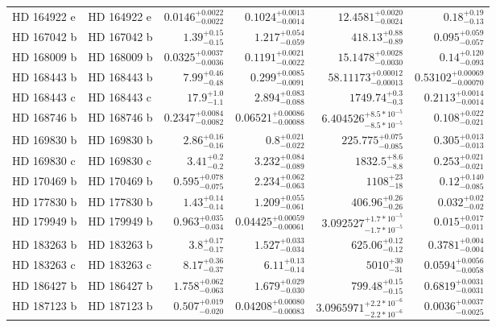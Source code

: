 \begin{longtable*}{llrrrr}
HD 164922 e & HD 164922 e & $0.0146^{+0.0022}_{-0.0022}$ & $0.1024^{+0.0013}_{-0.0014}$ & $12.4581^{+0.0020}_{-0.0024}$ & $0.18^{+0.19}_{-0.13}$ \\ 
HD 167042 b & HD 167042 b & $1.39^{+0.15}_{-0.15}$ & $1.217^{+0.054}_{-0.059}$ & $418.13^{+0.88}_{-0.89}$ & $0.095^{+0.059}_{-0.057}$ \\ 
HD 168009 b & HD 168009 b & $0.0325^{+0.0037}_{-0.0036}$ & $0.1191^{+0.0021}_{-0.0022}$ & $15.1478^{+0.0028}_{-0.0030}$ & $0.14^{+0.120}_{-0.093}$ \\ 
HD 168443 b & HD 168443 b & $7.99^{+0.46}_{-0.48}$ & $0.299^{+0.0085}_{-0.0091}$ & $58.11173^{+0.00012}_{-0.00013}$ & $0.53102^{+0.00069}_{-0.00070}$ \\ 
HD 168443 c & HD 168443 c & $17.9^{+1.0}_{-1.1}$ & $2.894^{+0.083}_{-0.088}$ & $1749.74^{+0.3}_{-0.3}$ & $0.2113^{+0.0014}_{-0.0014}$ \\ 
HD 168746 b & HD 168746 b & $0.2347^{+0.0084}_{-0.0082}$ & $0.06521^{+0.00086}_{-0.00088}$ & $6.404526^{+8.5*10^{-5}}_{-8.5*10^{-5}}$ & $0.108^{+0.022}_{-0.021}$ \\ 
HD 169830 b & HD 169830 b & $2.86^{+0.16}_{-0.16}$ & $0.8^{+0.021}_{-0.022}$ & $225.775^{+0.075}_{-0.085}$ & $0.305^{+0.013}_{-0.013}$ \\ 
HD 169830 c & HD 169830 c & $3.41^{+0.2}_{-0.2}$ & $3.232^{+0.084}_{-0.089}$ & $1832.5^{+8.6}_{-8.8}$ & $0.253^{+0.021}_{-0.021}$ \\ 
HD 170469 b & HD 170469 b & $0.595^{+0.078}_{-0.075}$ & $2.234^{+0.062}_{-0.063}$ & $1108^{+23}_{-18}$ & $0.12^{+0.140}_{-0.085}$ \\ 
HD 177830 b & HD 177830 b & $1.43^{+0.14}_{-0.14}$ & $1.209^{+0.055}_{-0.061}$ & $406.96^{+0.26}_{-0.26}$ & $0.032^{+0.02}_{-0.02}$ \\ 
HD 179949 b & HD 179949 b & $0.963^{+0.035}_{-0.034}$ & $0.04425^{+0.00059}_{-0.00061}$ & $3.092527^{+1.7*10^{-5}}_{-1.7*10^{-5}}$ & $0.015^{+0.017}_{-0.011}$ \\ 
HD 183263 b & HD 183263 b & $3.8^{+0.17}_{-0.17}$ & $1.527^{+0.033}_{-0.034}$ & $625.06^{+0.12}_{-0.12}$ & $0.3781^{+0.004}_{-0.004}$ \\ 
HD 183263 c & HD 183263 c & $8.17^{+0.36}_{-0.37}$ & $6.11^{+0.13}_{-0.14}$ & $5010^{+30}_{-31}$ & $0.0594^{+0.0056}_{-0.0058}$ \\ 
HD 186427 b & HD 186427 b & $1.758^{+0.062}_{-0.063}$ & $1.679^{+0.029}_{-0.030}$ & $799.48^{+0.15}_{-0.15}$ & $0.6819^{+0.0031}_{-0.0031}$ \\ 
HD 187123 b & HD 187123 b & $0.507^{+0.019}_{-0.020}$ & $0.04208^{+0.00080}_{-0.00083}$ & $3.0965971^{+2.2*10^{-6}}_{-2.2*10^{-6}}$ & $0.0036^{+0.0037}_{-0.0025}$ \\ 

\end{longtable*}
